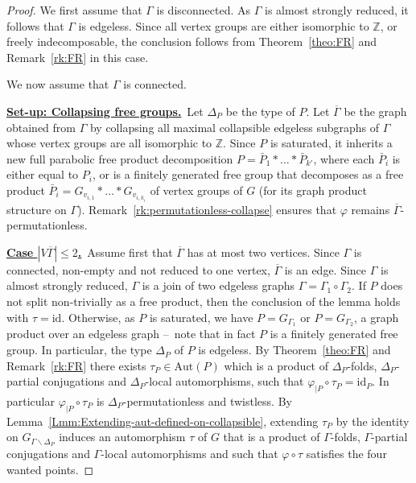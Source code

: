 \documentclass[a4paper,english,11pt]{article}
\theoremstyle{definition}
\theoremstyle{remark}
\newcommand{\Aut}{\mathrm{Aut}}
\begin{document}
\begin{proof}
We first assume that $\Gamma$ is disconnected. As $\Gamma$ is almost strongly reduced, it follows that $\Gamma$ is edgeless. Since all vertex groups are either isomorphic to $\mathbb{Z}$, or freely indecomposable, the conclusion follows from Theorem~\ref{theo:FR} and Remark~\ref{rk:FR} in this case.

We now assume that $\Gamma$ is connected. 

\medskip

\underline{\textbf{Set-up: Collapsing free groups.}}~Let $\Delta_P$ be the type of $P$. Let $\overline\Gamma$ be the graph obtained from $\Gamma$ by collapsing all maximal collapsible edgeless subgraphs of $\Gamma$ whose vertex groups are all isomorphic to $\mathbb{Z}$. Since $P$ is saturated, it inherits a new full parabolic free product decomposition $P=\bar P_1\ast\dots\ast \bar P_{k'}$, where each $\bar P_i$ is either equal to $P_i$, or is a finitely generated free group that decomposes as a free product $\bar P_i=G_{v_{i,1}}\ast\dots\ast G_{v_{i,k_i}}$ of vertex groups of $G$ (for its graph product structure on $\Gamma$). Remark~\ref{rk:permutationless-collapse} ensures that $\varphi$ remains $\overline\Gamma$-permutationless. 
\medskip

\underline{\textbf{Case $|V\overline{\Gamma}|\leq 2$.}}~Assume first that $\overline{\Gamma}$ has at most two vertices. Since $\Gamma$ is connected, non-empty and not reduced to one vertex, $\overline{\Gamma}$ is an edge. Since $\Gamma$ is almost strongly reduced, $\Gamma$ is a join of two edgeless graphs $\Gamma=\Gamma_1\circ\Gamma_2$. If $P$ does not split non-trivially as a free product, then the conclusion of the lemma holds with $\tau=\mathrm{id}$. Otherwise, as $P$ is saturated, we have $P=G_{\Gamma_1}$ or $P=G_{\Gamma_2}$, a graph product over an edgeless graph –~note that in fact $P$ is a finitely generated free group. In particular, the type $\Delta_P$ of $P$ is edgeless. By Theorem~\ref{theo:FR} and Remark~\ref{rk:FR} there exists $\tau_P\in \Aut(P)$ which is a product of $\Delta_P$-folds, $\Delta_P$-partial conjugations and $\Delta_P$-local automorphisms, such that $\varphi_{|P}\circ \tau_P=\mathrm{id}_P$. In particular $\varphi_{|P}\circ \tau_P$ is $\Delta_P$-permutationless and twistless. By Lemma~\ref{Lmm:Extending-aut-defined-on-collapsible}, extending $\tau_P$ by the identity on $G_{\Gamma\backslash \Delta_P}$ induces an automorphism $\tau$ of $G$ that is a product of $\Gamma$-folds, $\Gamma$-partial conjugations and $\Gamma$-local automorphisms and such that $\varphi\circ\tau$ satisfies the four wanted points.


\end{proof}
\end{document}
